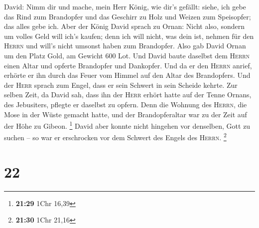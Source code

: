 David: Nimm dir und mache, mein Herr König, wie dir's gefällt: siehe,
ich gebe das Rind zum Brandopfer und das Geschirr zu Holz und Weizen zum
Speisopfer; das alles gebe ich.  Aber der König David
sprach zu Ornan: Nicht also, sondern um volles Geld will ich's kaufen;
denn ich will nicht, was dein ist, nehmen für den \textsc{Herrn} und
will's nicht umsonst haben zum Brandopfer.  Also gab
David Ornan um den Platz Gold, am Gewicht 600 Lot.  Und
David baute daselbst dem \textsc{Herrn} einen Altar und opferte
Brandopfer und Dankopfer. Und da er den \textsc{Herrn} anrief, erhörte
er ihn durch das Feuer vom Himmel auf den Altar des Brandopfers.
 Und der \textsc{Herr} sprach zum Engel, dass er sein
Schwert in sein Scheide kehrte.  Zur selben Zeit, da
David sah, dass ihn der \textsc{Herr} erhört hatte auf der Tenne Ornans,
des Jebusiters, pflegte er daselbst zu opfern.  Denn die
Wohnung des \textsc{Herrn}, die Mose in der Wüste gemacht hatte, und der
Brandopferaltar war zu der Zeit auf der Höhe zu Gibeon. \footnote{\textbf{21:29}
  1Chr 16,39}  David aber konnte nicht hingehen vor
denselben, Gott zu suchen -- so war er erschrocken vor dem Schwert des
Engels des \textsc{Herrn}. \footnote{\textbf{21:30} 1Chr 21,16}

\hypertarget{section-4}{%
\section{22}\label{section-4}}

